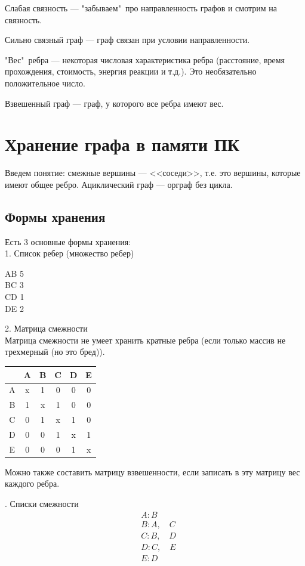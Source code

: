 \documentclass[a4paper,12pt]{article}
\theoremstyle{plain} %
\theoremstyle{definition} %
\theoremstyle{remark} %
\begin{document}
Слабая связность --- "забываем"\  про направленность графов и смотрим на связность.

Сильно связный граф --- граф связан при условии направленности.

"Вес"\  ребра --- некоторая числовая характеристика ребра (расстояние, время прохождения, стоимость, энергия реакции и т.д.). Это необязательно положительное число.

Взвешенный граф --- граф, у которого все ребра имеют вес.

\section{Хранение графа в памяти ПК}
Введем понятие: смежные вершины --- <<соседи>>, т.е. это вершины, которые имеют общее ребро. Ациклический граф --- орграф без цикла.

\subsection{Формы хранения}
Есть 3 основные формы хранения:\\
1. Список ребер (множество ребер)
\begin{center}
AB 5\\
BC 3\\
CD 1\\
DE 2\\
\end{center}
2. Матрица смежности\\
Матрица смежности не умеет хранить кратные ребра (если только массив не трехмерный (но это бред)).

\begin{center}
\begin{tabular}{|c|c|c|c|c|c|}
	\hline 
	& A & B & C & D & E \\ 
	\hline 
	A & x & 1 & 0 & 0 & 0 \\ 
	\hline 
	B & 1 & x & 1 & 0 & 0 \\ 
	\hline 
	C & 0 & 1 & x & 1 & 0 \\ 
	\hline 
	D & 0 & 0 & 1 & x & 1 \\ 
	\hline 
	E & 0 & 0 & 0 & 1 & x \\ 
	\hline 
\end{tabular}
\end{center}

Можно  также составить матрицу взвешенности, если записать в эту матрицу вес каждого ребра.

. Списки смежности\\
\begin{align*}
&A : B\\
&B : A, \quad C\\
&C : B, \quad D\\
&D : C, \quad E\\
&E : D\\
\end{align*}
\end{document}
